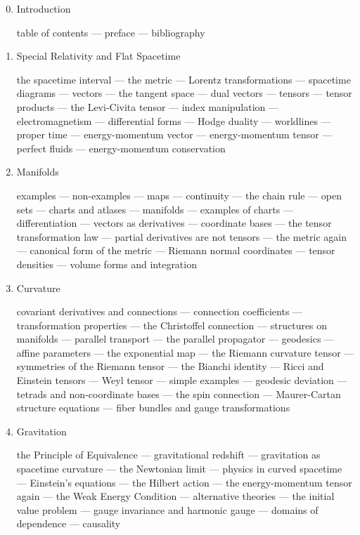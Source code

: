 \documentclass[12pt]{article}
\begin{document}
\begin{enumerate}
\setcounter{enumi}{-1}

\item{Introduction}

table of contents --- preface --- bibliography

\item{Special Relativity and Flat Spacetime}

the spacetime interval --- the metric --- Lorentz transformations ---
  spacetime diagrams --- vectors --- the tangent space ---
  dual vectors --- tensors --- tensor products --- the Levi-Civita
  tensor --- index manipulation --- electromagnetism ---
  differential forms --- Hodge duality --- worldlines --- proper time ---
  energy-momentum vector --- energy-momentum tensor --- perfect fluids
  --- energy-momentum conservation

\item{Manifolds}

examples --- non-examples --- maps --- continuity --- the chain rule ---
  open sets --- charts and atlases --- manifolds --- examples of charts ---
  differentiation --- vectors as derivatives --- coordinate bases ---
  the tensor transformation law --- partial derivatives are not tensors --- 
  the metric again --- canonical form of the metric --- Riemann normal 
  coordinates --- tensor densities --- volume forms and integration

\item{Curvature}

covariant derivatives and connections --- connection coefficients
  --- transformation properties --- the Christoffel connection --- 
  structures on manifolds --- parallel transport --- the parallel 
  propagator --- geodesics --- affine parameters --- the exponential
  map --- the Riemann curvature tensor --- symmetries of the Riemann
  tensor --- the Bianchi identity --- Ricci and Einstein tensors ---
  Weyl tensor --- simple examples --- geodesic deviation --- tetrads
  and non-coordinate bases --- the spin connection --- Maurer-Cartan
  structure equations --- fiber bundles and gauge transformations

\item{Gravitation}

the Principle of Equivalence --- gravitational redshift ---
  gravitation as spacetime curvature --- the Newtonian limit ---
  physics in curved spacetime --- Einstein's equations --- the Hilbert
  action --- the energy-momentum tensor again --- the Weak Energy
  Condition --- alternative theories --- the initial value problem ---
  gauge invariance and harmonic gauge --- domains of dependence ---
  causality


\end{enumerate}
\end{document}
